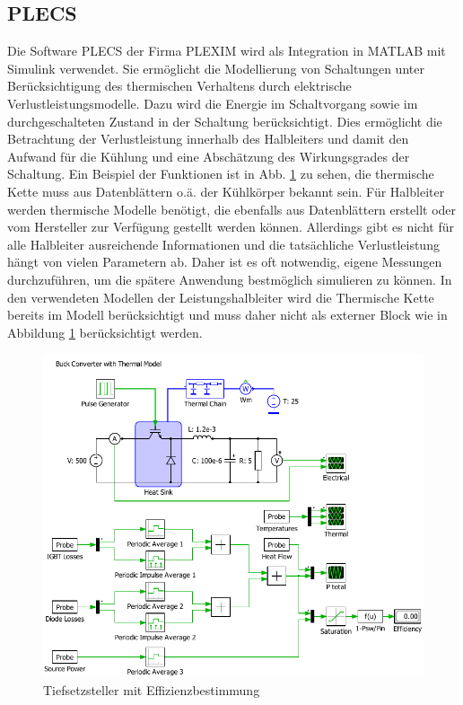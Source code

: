 	\subsection{PLECS}
	Die Software \gls{PLECS} der Firma PLEXIM wird als Integration in MATLAB mit Simulink verwendet.  Sie ermöglicht die Modellierung von Schaltungen unter Berücksichtigung des thermischen Verhaltens durch elektrische Verlustleistungsmodelle. Dazu wird die Energie im Schaltvorgang sowie im durchgeschalteten Zustand in der Schaltung berücksichtigt. Dies ermöglicht die Betrachtung der Verlustleistung innerhalb des Halbleiters und damit den Aufwand für die Kühlung und eine Abschätzung des Wirkungsgrades der Schaltung. Ein Beispiel der Funktionen ist in Abb. \ref{fig:plecsbuck} zu sehen, die thermische Kette muss aus Datenblättern o.ä. der Kühlkörper bekannt sein. Für Halbleiter werden thermische Modelle benötigt, die ebenfalls aus Datenblättern erstellt oder vom Hersteller zur Verfügung gestellt werden können. Allerdings gibt es nicht für alle Halbleiter ausreichende Informationen und die tatsächliche Verlustleistung hängt von vielen Parametern ab. Daher ist es oft notwendig, eigene Messungen durchzuführen, um die spätere Anwendung bestmöglich simulieren zu können. In den verwendeten Modellen der Leistungshalbleiter wird die Thermische Kette bereits im Modell berücksichtigt und muss daher nicht als externer Block wie in Abbildung \ref{fig:plecsbuck} berücksichtigt werden.  \\
	
	\begin{figure}
		\centering
		\includegraphics[width=0.9\linewidth]{content/Grafiken/PLECS_Buck}
		\caption[Tiefsetzsteller mit Effizienzbestimmung]{Tiefsetzsteller mit Effizienzbestimmung}
		\label{fig:plecsbuck}
	\end{figure}
	